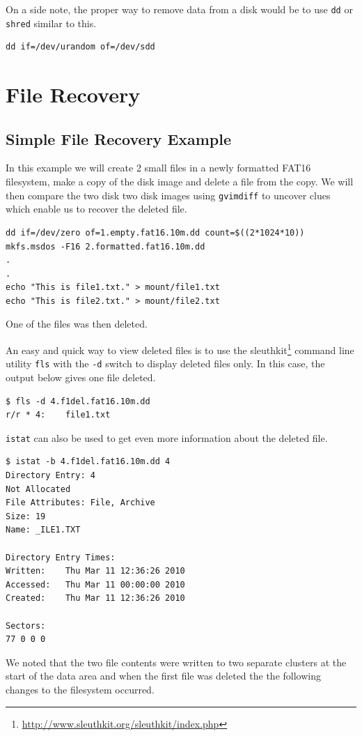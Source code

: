 \documentclass[a4paper,
    11pt,
    normalheadings,
    parindent,
    UKenglish,
    abstracton,
    ]{scrartcl}
\begin{document}
On a side note, the proper way to remove data from a disk would be to use \texttt{dd} or \texttt{shred} similar to this.

\begin{verbatim}
dd if=/dev/urandom of=/dev/sdd
\end{verbatim}

\section{File Recovery}
\subsection{Simple File Recovery Example}
In this example we will create 2 small files in a newly formatted FAT16 filesystem, make a copy of the disk image and delete a file from the copy. We will then compare the two disk two disk images using \texttt{gvimdiff} to uncover clues which enable us to recover the deleted file.

\begin{verbatim}
dd if=/dev/zero of=1.empty.fat16.10m.dd count=$((2*1024*10))
mkfs.msdos -F16 2.formatted.fat16.10m.dd
.
.
echo "This is file1.txt." > mount/file1.txt
echo "This is file2.txt." > mount/file2.txt
\end{verbatim}
One of the files was then deleted.

An easy and quick way to view deleted files is to use the sleuthkit\footnote{\url{http://www.sleuthkit.org/sleuthkit/index.php}} command line utility \texttt{fls} with the \texttt{-d} switch to display deleted files only. In this case, the output below gives one file deleted.
\begin{verbatim}
$ fls -d 4.f1del.fat16.10m.dd
r/r * 4:	file1.txt
\end{verbatim}

\texttt{istat} can also be used to get even more information about the deleted file.
\begin{verbatim}
$ istat -b 4.f1del.fat16.10m.dd 4
Directory Entry: 4
Not Allocated
File Attributes: File, Archive
Size: 19
Name: _ILE1.TXT

Directory Entry Times:
Written:	Thu Mar 11 12:36:26 2010
Accessed:	Thu Mar 11 00:00:00 2010
Created:	Thu Mar 11 12:36:26 2010

Sectors:
77 0 0 0
\end{verbatim}

We noted that the two file contents were written to two separate clusters at the start of the data area and when the first file was deleted the the following changes to the filesystem occurred.
\end{document}
